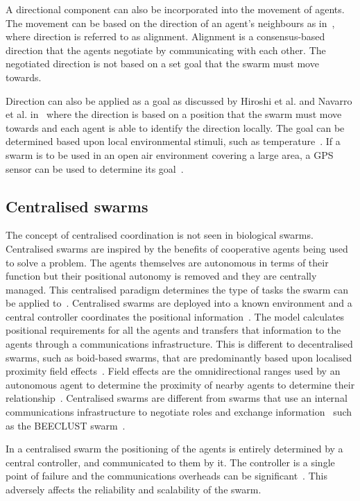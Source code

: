 A directional component can also be incorporated into the movement of agents. The movement can be based on the direction of an agent's neighbours as in~\cite{REY:87, JMM:08}, where direction is referred to as alignment. Alignment is a consensus-based direction that the agents negotiate by communicating with each other. The negotiated direction is not based on a set goal that the swarm must move towards. 

Direction can also be applied as a goal as discussed by Hiroshi et al. and Navarro et al. in~\cite{HAY:08, IGMFM:08} where the direction is based on a position that the swarm must move towards and each agent is able to identify the direction locally. The goal can be determined based upon local environmental stimuli, such as temperature~\cite{PG:08}. If a swarm is to be used in an open air environment covering a large area, a GPS sensor can be used to determine its goal~\cite{SH:11}. 

\subsection{Centralised swarms}
The concept of centralised coordination is not seen in biological swarms.
Centralised swarms are inspired by the benefits of cooperative agents being used to solve a problem. The agents themselves are autonomous in terms of their function but their positional autonomy is removed and they are centrally managed. This centralised paradigm determines the type of tasks the swarm can be applied to~\cite{AZMD:15, MGFND:05, LADPC:07}. Centralised swarms are deployed into a known environment and a central controller coordinates the positional information~\cite{MP:09, I:01, NM:12, SB:93, MYP:09}. The model calculates positional requirements for all the agents and transfers that information to the agents through a communications infrastructure. This is different to decentralised swarms, such as boid-based swarms, that are predominantly based upon localised proximity field effects~\cite{BAF:06, BAFVM:06, BFV:07, BM:09}. Field effects are the omnidirectional ranges used by an autonomous agent to determine the proximity of nearby agents to determine their relationship~\cite{BAF:06}. Centralised swarms are different from swarms that use an internal communications infrastructure to negotiate roles and exchange information~\cite{OFM:07} such as the BEECLUST swarm~\cite{HER:11}. 

In a centralised swarm the positioning of the agents is entirely determined by a central controller, and communicated to them by it. The controller is a single point of failure and the communications overheads can be significant~\cite{NVC:15}. This adversely affects the reliability and scalability of the swarm.

